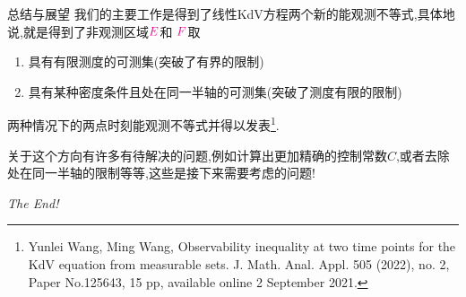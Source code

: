 \begin{frame}{总结与展望}
  我们的主要工作是得到了线性KdV方程两个新的能观测不等式,具体地说,就是得到了非观测区域${\color{magenta}E}$和 ${\color{magenta}F}$取
  \begin{enumerate}
    \item[(1)] 具有有限测度的可测集(突破了{\color{magenta}有界}的限制)
    \item[(2)] 具有某种密度条件且处在同一半轴的可测集(突破了{\color{magenta}测度有限}的限制)
  \end{enumerate}
  两种情况下的{\color{red}两点时刻能观测不等式}并得以发表\footnote{Yunlei Wang, Ming Wang, Observability inequality at two time points for the KdV equation from measurable sets. J. Math. Anal. Appl. 505 (2022), no. 2, Paper No.125643, 15 pp, available online 2 September 2021.}.
  
  关于这个方向有许多有待解决的问题,例如计算出更加精确的控制常数$C$,或者去除处在同一半轴的限制等等,这些是接下来需要考虑的问题!
\end{frame}
\begin{frame}
  \begin{center}
    \Huge {\itshape The End!}
\end{center}
\end{frame}
